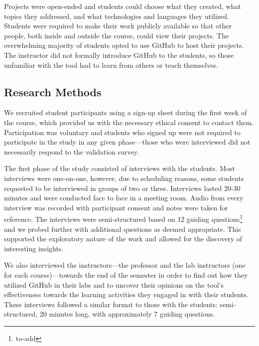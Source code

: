 Projects were open-ended and students could choose what they created, what topics they addressed, and what technologies and languages they utilized. Students were required to make their work publicly available so that other people, both inside and outside the course, could view their projects. The overwhelming majority of students opted to use GitHub to host their projects. The instructor did not formally introduce GitHub to the students, so those unfamiliar with the tool had to learn from others or teach themselves. %

\subsection{Research Methods}
We recruited student participants using a sign-up sheet during the first week of the course, which provided us with the necessary ethical consent to contact them. Participation was voluntary and students who signed up were not required to participate in the study in any given phase---those who were interviewed did not necessarily respond to the validation survey.

The first phase of the study consisted of interviews with the students. Most interviews were one-on-one, however, due to scheduling reasons, some students requested to be interviewed in groups of two or three. Interviews lasted 20-30 minutes and were conducted face to face in a meeting room. Audio from every interview was recorded with participant consent and notes were taken for reference. The interviews were semi-structured based on 12 guiding questions\footnote{to-add} and we probed further with additional questions as deemed appropriate. This supported the exploratory nature of the work and allowed for the discovery of interesting insights.

We also interviewed the instructors---the professor and the lab instructors (one for each course)---towards the end of the semester in order to find out how they utilized GitHub in their labs and to uncover their opinions on the tool's effectiveness towards the learning activities they engaged in with their students. These interviews followed a similar format to those with the students: semi-structured, 20 minutes long, with approximately 7 guiding questions.

